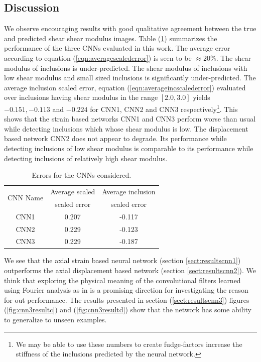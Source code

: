 \documentclass[12pt]{article}
\begin{document}
\subsection{\label{sect:discussion}Discussion}
We observe encouraging results with good qualitative agreement between the true and predicted shear shear modulus images. Table (\ref{table:cnnstatsummary}) summarizes the performance of the three CNNs evaluated in this work. The average error according to equation (\ref{eqn:averagescalederror}) is seen to be $\approx{20\%}$. The shear modulus of inclusions is under-predicted. The shear modulus of inclusions with low shear modulus and small sized inclusions is significantly under-predicted. The average inclusion scaled error, equation (\ref{eqn:averageincscalederror}) evaluated over inclusions having shear modulus in the range $[2.0,3.0]$ yields $-0.151,-0.113$ and $-0.224$ for CNN1, CNN2 and CNN3 respectively\footnote{We may be able to use these numbers to create fudge-factors increase the stiffness of the inclusions predicted by the neural network.}. This shows that the strain based networks CNN1 and CNN3 perform worse than usual while detecting inclusions which whose shear modulus is low. The displacement based network CNN2 does not appear to degrade. Its performance while detecting inclusions of low shear modulus is comparable to its performance while detecting inclusions of relatively high shear modulus. 


\begin{table}
  \centering
  \begin{tabular}{|c|c|c|}
    \hline
    \multirow{2}{*}{CNN Name} & Average scaled & Average inclusion \\
                              & scaled error   & scaled error      \\
    \hline
    CNN1     & 0.207 & -0.117\\
    \hline
    CNN2     & 0.229 & -0.123\\
    \hline
    CNN3     & 0.229 & -0.187\\
    \hline
  \end{tabular}
  \caption{\label{table:cnnstatsummary} Errors for the CNNs considered.}
\end{table}  

We see that the axial strain based neural network (section {\ref{sect:resultscnn1}}) outperforms the axial displacement based network (section \ref{sect:resultscnn2}). We think that exploring the physical meaning of the convolutional filters learned using Fourier analysis as in \cite{paper:pateloberai2019} is a promising direction for investigating the reason for out-performance. The results presented in section (\ref{sect:resultscnn3}) figures (\ref{fig:cnn3resultc}) and (\ref{fig:cnn3resultd}) show that the network has some ability to generalize to unseen examples.
%
\end{document}
